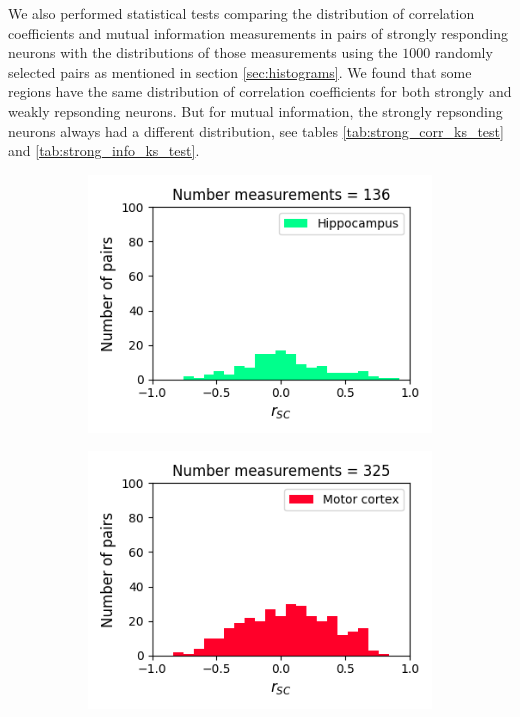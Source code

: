 \documentclass[a4paper,12pt]{article}
\theoremstyle{definition}
\begin{document}
We also performed statistical tests comparing the distribution of correlation coefficients and mutual information measurements in pairs of strongly responding neurons with the distributions of those measurements using the $1000$ randomly selected pairs as mentioned in section \ref{sec:histograms}. We found that some regions have the same distribution of correlation coefficients for both strongly and weakly repsonding neurons. But for mutual information, the strongly repsonding neurons always had a different distribution, see tables \ref{tab:strong_corr_ks_test} and \ref{tab:strong_info_ks_test}.

\begin{figure}[p]
  \begin{subfigure}{0.5\textwidth}
    \centering
    \includegraphics[width=\textwidth]{figures/strong_hippocampus_6_1p0_correlation_histogram.png}
  \end{subfigure}
  \begin{subfigure}{0.5\textwidth}
    \centering
    \includegraphics[width=\textwidth]{figures/strong_motor_cortex_10_1p0_correlation_histogram.png}

\end{subfigure}
\end{figure}
\end{document}
